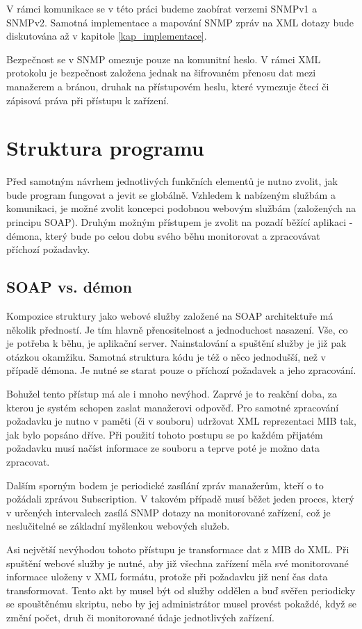 V rámci komunikace se v této práci budeme zaobírat verzemi SNMPv1 a SNMPv2. Samotná implementace a mapování SNMP zpráv na XML dotazy
bude diskutována až v kapitole \ref{kap_implementace}.

Bezpečnost se v SNMP omezuje pouze na komunitní heslo. V rámci XML protokolu je bezpečnost založena jednak na šifrovaném přenosu dat mezi
manažerem a bránou, druhak na přístupovém heslu, které vymezuje čtecí či zápisová práva při přístupu k zařízení. 


\section{Struktura programu}
\label{sec_an_struktura_programu}
Před samotným návrhem jednotlivých funkčních elementů je nutno zvolit, jak bude program fungovat a jevit se globálně. Vzhledem k
nabízeným službám a komunikaci, je možné zvolit koncepci podobnou webovým službám (založených na principu SOAP). Druhým možným přístupem je zvolit
na pozadí běžící aplikaci - démona, který bude po celou dobu svého běhu monitorovat a zpracovávat příchozí požadavky.

\subsection{SOAP vs. démon}
Kompozice struktury jako webové služby založené na SOAP architektuře má několik předností. Je tím hlavně přenositelnost a jednoduchost nasazení. Vše, co je potřeba k běhu,
je aplikační server. Nainstalování a spuštění služby je již pak otázkou okamžiku. Samotná struktura kódu je též o něco jednodušší, než v případě démona. Je nutné se starat pouze o
příchozí požadavek a jeho zpracování.

Bohužel tento přístup má ale i mnoho nevýhod. Zaprvé je to reakční doba, za kterou je systém schopen zaslat manažerovi odpověď. Pro samotné zpracování požadavku
je nutno v paměti (či v souboru) udržovat XML reprezentaci MIB tak, jak bylo popsáno dříve. Při použití tohoto postupu se po každém přijatém požadavku musí načíst informace ze souboru
a teprve poté je možno data zpracovat.

Dalším sporným bodem je periodické zasílání zpráv manažerům, kteří o to požádali zprávou Subscription. V takovém případě musí běžet jeden proces, který v určených intervalech zasílá SNMP
dotazy na monitorované zařízení, což je neslučitelné se základní myšlenkou webových služeb.

Asi největší nevýhodou tohoto přístupu je transformace dat z MIB do XML. Při spuštění webové služby je nutné, aby již všechna zařízení měla své monitorované informace uloženy v XML formátu, 
protože při požadavku již není čas data transformovat. Tento akt by musel být od služby oddělen a buď svěřen periodicky se spouštěnému skriptu, nebo by jej administrátor musel provést pokaždé,
když se změní počet, druh či monitorované údaje jednotlivých zařízení.

